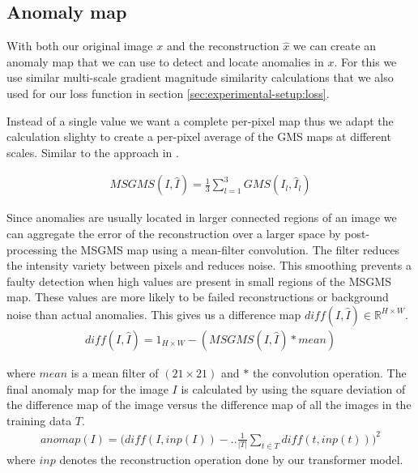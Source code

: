 \subsection{Anomaly map}
\label{subsec:experimental-setup:anomaly-map}

With both our original image $x$ and the reconstruction $\hat{x}$ we can create an anomaly map that we can use to detect and locate anomalies in $x$. For this we use similar multi-scale gradient magnitude similarity calculations that we also used for our loss function in section \ref{sec:experimental-setup:loss}.

Instead of a single value we want a complete per-pixel map thus we adapt the calculation slighty to create a per-pixel average of the GMS maps at different scales. Similar to the approach in \cite{pirnay_inpainting_2021, zavrtanik_reconstruction_2021}.

\begin{align}
MSGMS(I, \hat{I}) = \frac{1}{3} \sum_{l=1}^{3} {GMS(I_l, \hat{I}_l)}
\label{eq:experimental-setup:msgms}
\end{align}

Since anomalies are usually located in larger connected regions of an image we can aggregate the error of the reconstruction over a larger space by post-processing the MSGMS map using a mean-filter convolution. The filter reduces the intensity variety between pixels and reduces noise. This smoothing prevents a faulty detection when high values are present in small regions of the MSGMS map. These values are more likely to be failed reconstructions or background noise than actual anomalies. This gives us a difference map $diff(I, \hat{I}) \in \mathbb{R}^{H \times W}$.
%
\begin{align}
diff(I, \hat{I}) = 1_{H \times W} - (MSGMS(I, \hat{I}) \ast mean)
\label{eq:experimental-setup:diff}
\end{align}

where $mean$ is a mean filter of $(21\times21)$ and $\ast$ the convolution operation. 
%
The final anomaly map for the image $I$ is calculated by using the square deviation of the difference map of the image versus the difference map of all the images in the training data $T$.
%
\begin{equation}
\begin{aligned}
anomap(I) = \biggl( {diff}(I, inp(I)) - \bigr. \biggl. \frac{1}{|T|} \sum_{t \in T}{{diff}(t, inp(t))} \Bigr) ^ 2
\label{eq:experimental-setup:anomap}
\end{aligned}
\end{equation}
%
where $inp$ denotes the reconstruction operation done by our transformer model.

